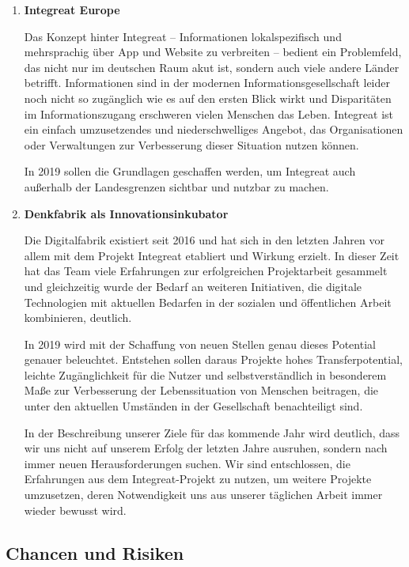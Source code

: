 \documentclass[12pt, a4paper]{article} %
\begin{document}
\begin{enumerate}
\item
\textbf{Integreat Europe}

Das Konzept hinter Integreat – Informationen lokalspezifisch und
mehrsprachig über App und Website zu verbreiten – bedient ein
Problemfeld, das nicht nur im deutschen Raum akut ist, sondern auch
viele andere Länder betrifft. Informationen sind in der modernen
Informationsgesellschaft leider noch nicht so zugänglich wie es auf den
ersten Blick wirkt und Disparitäten im Informationszugang erschweren
vielen Menschen das Leben. Integreat ist ein einfach umzusetzendes und
niederschwelliges Angebot, das Organisationen oder Verwaltungen zur
Verbesserung dieser Situation nutzen können.

In 2019 sollen die Grundlagen geschaffen werden, um Integreat auch
außerhalb der Landesgrenzen sichtbar und nutzbar zu machen.

\item
\textbf{Denkfabrik als Innovationsinkubator}

Die Digitalfabrik existiert seit 2016 und hat sich in den letzten Jahren
vor allem mit dem Projekt Integreat etabliert und Wirkung erzielt. In
dieser Zeit hat das Team viele Erfahrungen zur erfolgreichen
Projektarbeit gesammelt und gleichzeitig wurde der Bedarf an weiteren
Initiativen, die digitale Technologien mit aktuellen Bedarfen in der
sozialen und öffentlichen Arbeit kombinieren, deutlich.

In 2019 wird mit der Schaffung von neuen Stellen genau dieses Potential
genauer beleuchtet. Entstehen sollen daraus Projekte hohes
Transferpotential, leichte Zugänglichkeit für die Nutzer und
selbstverständlich in besonderem Maße zur Verbesserung der
Lebenssituation von Menschen beitragen, die unter den aktuellen
Umständen in der Gesellschaft benachteiligt sind.

In der Beschreibung unserer Ziele für das kommende Jahr wird deutlich,
dass wir uns nicht auf unserem Erfolg der letzten Jahre ausruhen,
sondern nach immer neuen Herausforderungen suchen. Wir sind
entschlossen, die Erfahrungen aus dem Integreat-Projekt zu nutzen, um
weitere Projekte umzusetzen, deren Notwendigkeit uns aus unserer
täglichen Arbeit immer wieder bewusst wird.

\end{enumerate}

\hypertarget{chancen-und-risiken}{%
\subsection{Chancen und Risiken}\label{chancen-und-risiken}}
\end{document}
